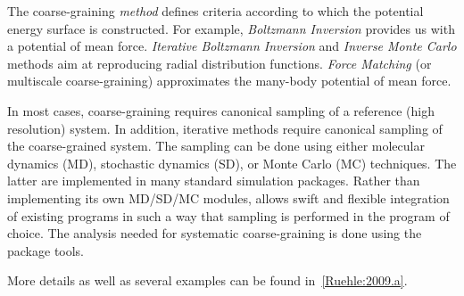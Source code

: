 The coarse-graining {\em method} defines criteria according to which the potential energy surface is constructed. For example, {\em Boltzmann Inversion} provides us with a potential of mean force. {\em Iterative Boltzmann Inversion} and {\em Inverse Monte Carlo} methods aim at reproducing radial distribution functions. {\em Force Matching} (or multiscale coarse-graining) approximates the many-body potential of mean force.

In most cases, coarse-graining requires canonical sampling of a reference (high resolution) system. In addition, iterative methods require canonical sampling of the coarse-grained system. The sampling can be done using either molecular dynamics (MD), stochastic dynamics (SD), or Monte Carlo (MC) techniques. The latter are implemented in many standard simulation packages. Rather than implementing its own MD/SD/MC modules, \votca allows swift and flexible integration of existing  programs in such a way that sampling is performed in the program of choice. The analysis needed for systematic coarse-graining is done using the package tools.

More details as well as several examples can be found in~\ref{Ruehle:2009.a}. 